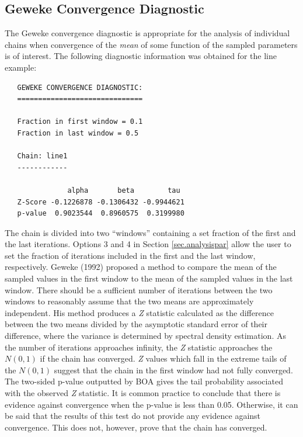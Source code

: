 \documentclass[12pt,letterpaper]{report}
\begin{document}
\subsection{Geweke Convergence Diagnostic}
\label{ssec.geweke}
\noindent
The Geweke convergence diagnostic is appropriate for the analysis of individual
chains when convergence of the {\it mean} of some function of the sampled
parameters is of interest. The following diagnostic information was obtained for
the line example:
\vskip 9pt
\begin{tiny}
\begin{verbatim}
   GEWEKE CONVERGENCE DIAGNOSTIC:
   ==============================

   Fraction in first window = 0.1
   Fraction in last window = 0.5

   Chain: line1
   ------------

               alpha       beta        tau
   Z-Score -0.1226878 -0.1306432 -0.9944621
   p-value  0.9023544  0.8960575  0.3199980
\end{verbatim}
\end{tiny}
The chain is divided into two ``windows'' containing a set fraction of the first
and the last iterations. Options 3 and 4 in Section \ref{sec.analysispar}
allow the user to set the fraction of iterations included in the first and the
last window, respectively. Geweke (1992) proposed a method to compare the mean
of the sampled values in the first window to the mean of the sampled values in
the last window. There should be a sufficient number of iterations between the
two windows to reasonably assume that the two means are approximately
independent. His method produces a {\it Z} statistic calculated as the
difference between the two means divided by the asymptotic standard error of
their difference, where the variance is determined by spectral density
estimation. As the number of iterations approaches infinity, the {\it Z}
statistic approaches the $N(0,1)$ if the chain has converged. {\it Z} values
which fall in the extreme tails of the $N(0,1)$ suggest that the chain in the
first window had not fully converged. The two-sided p-value outputted by BOA
gives the tail probability associated with the observed {\it Z} statistic. It is
common practice to conclude that there is evidence against convergence when the
p-value is less than 0.05. Otherwise, it can be said that the results of this
test do not provide any evidence against convergence. This does not, however,
prove that the chain has converged.
\end{document}
